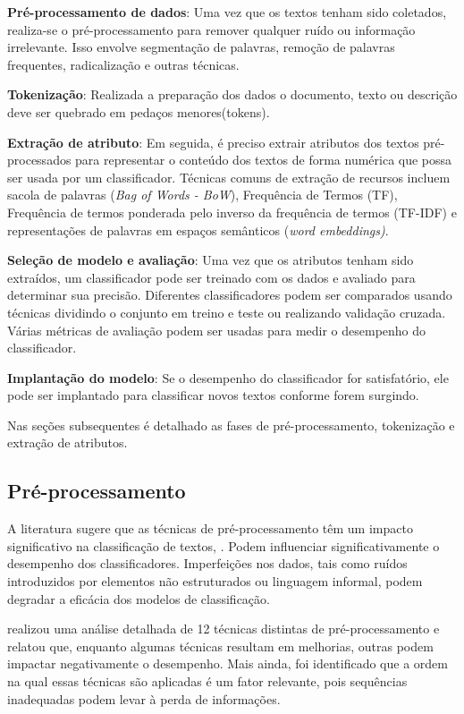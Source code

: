 \textbf{Pré-processamento de dados}: Uma vez que os textos tenham sido coletados, realiza-se o pré-processamento para remover qualquer ruído ou informação irrelevante. Isso envolve segmentação de palavras, remoção de palavras frequentes, radicalização e outras técnicas.

\textbf{Tokenização}: Realizada a preparação dos dados o documento, texto ou descrição deve ser quebrado em pedaços menores(tokens).

\textbf{Extração de atributo}: Em seguida, é preciso extrair atributos dos textos pré-processados para representar o conteúdo dos textos de forma numérica que possa ser usada por um classificador. Técnicas comuns de extração de recursos incluem sacola de palavras (\textit{Bag of Words - BoW}), Frequência de Termos (TF), Frequência de termos ponderada pelo inverso da frequência de termos (TF-IDF) e representações de palavras em espaços semânticos (\textit{word embeddings)}.

\textbf{Seleção de modelo e avaliação}: Uma vez que os atributos tenham sido extraídos, um classificador pode ser treinado com os dados e avaliado para determinar sua precisão. Diferentes classificadores podem ser comparados usando técnicas dividindo o conjunto em treino e teste ou realizando validação cruzada.  Várias métricas de avaliação podem ser usadas para medir o desempenho do classificador.

\textbf{Implantação do modelo}: Se o desempenho do classificador for satisfatório, ele pode ser implantado para classificar novos textos conforme forem surgindo.

Nas seções subsequentes é detalhado as fases de pré-processamento, tokenização e extração de atributos.

\subsection{Pré-processamento}\label{subsec:preprocessamento}

A literatura sugere que as técnicas de pré-processamento têm um impacto significativo na classificação de textos, \cite{naseem2021survey}. Podem influenciar significativamente o desempenho dos classificadores. Imperfeições nos dados, tais como ruídos introduzidos por elementos não estruturados ou linguagem informal, podem degradar a eficácia dos modelos de classificação.

\cite{naseem2021survey} realizou uma análise detalhada de 12 técnicas distintas de pré-processamento e relatou que, enquanto algumas técnicas resultam em melhorias, outras podem impactar negativamente o desempenho. Mais ainda, foi identificado que a ordem na qual essas técnicas são aplicadas é um fator relevante, pois sequências inadequadas podem levar à perda de informações.

